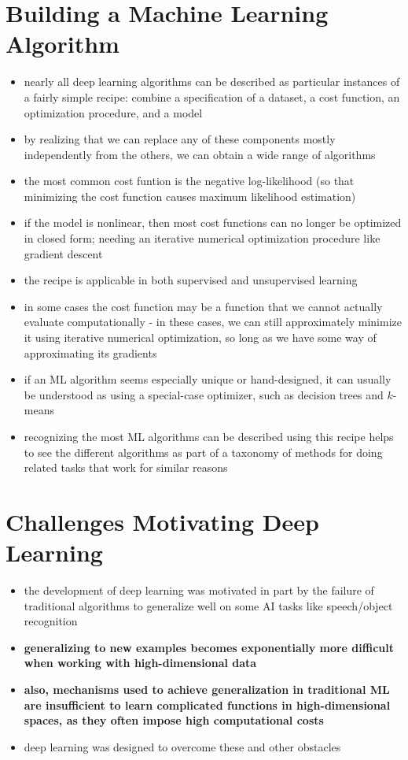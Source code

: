\documentclass[11pt, twocolumn]{report}
\begin{document}
\section{Building a Machine Learning Algorithm}
\begin{itemize}
  \item nearly all deep learning algorithms can be described as particular
    instances of a fairly simple recipe: combine a specification of a dataset,
    a cost function, an optimization procedure, and a model
  \item by realizing that we can replace any of these components mostly
    independently from the others, we can obtain a wide range of algorithms
  \item the most common cost funtion is the negative log-likelihood (so that
    minimizing the cost function causes maximum likelihood estimation)
  \item if the model is nonlinear, then most cost functions can no longer be
    optimized in closed form; needing an iterative numerical optimization
    procedure like gradient descent
  \item the recipe is applicable in both supervised and unsupervised learning
  \item in some cases the cost function may be a function that we cannot
    actually evaluate computationally - in these cases, we can still
    approximately minimize it using iterative numerical optimization, so long
    as we have some way of approximating its gradients
  \item if an ML algorithm seems especially unique or hand-designed, it can
    usually be understood as using a special-case optimizer, such as decision
    trees and $k$-means
  \item recognizing the most ML algorithms can be described using this recipe
    helps to see the different algorithms as part of a taxonomy of methods for
    doing related tasks that work for similar reasons
\end{itemize}

\section{Challenges Motivating Deep Learning}
\begin{itemize}
  \item the development of deep learning was motivated in part by the failure
    of traditional algorithms to generalize well on some AI tasks like
    speech/object recognition
  \item \textbf{generalizing to new examples becomes exponentially more
      difficult when working with high-dimensional data}
  \item \textbf{also, mechanisms used to achieve generalization in traditional
      ML are insufficient to learn complicated functions in high-dimensional
      spaces, as they often impose high computational costs}
  \item deep learning was designed to overcome these and other obstacles
\end{itemize}
\end{document}
